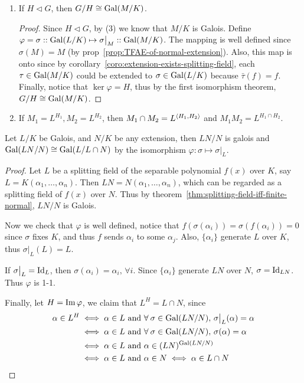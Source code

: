 \begin{theorem}
\begin{enumerate}[(\arabic*)]
    \item If $H \lhd G$, then $G / H \cong \operatorname{Gal}(M/K)$.
      \begin{proof}
        Since $H \lhd G$, by (3) we know that $M/K$ is Galois. Define $\varphi = \sigma :: \operatorname{Gal}(L/K)
        \mapsto \sigma\big|_M :: \operatorname{Gal}(M/K)$. The mapping is well defined
        since $\sigma(M) = M$ (by prop~\ref{prop:TFAE-of-normal-extension}).
        Also, this map is onto since by corollary~\ref{coro:extension-exists-splitting-field},
        each $\tau \in \operatorname{Gal}(M/K)$ could be extended to $\sigma \in \operatorname{Gal}(L/K)$ because
        $\bar\tau(f) = f$. Finally, notice that $\ker \varphi = H$, thus by the
        first isomorphism theorem, $G/H \cong \operatorname{Gal}(M/K)$.
      \end{proof}

    \item If $M_1 = L^{H_1}, M_2 = L^{H_2}$, then $M_1 \cap M_2 = L^{\langle H_1, H_2\rangle}$ and
      $M_1 M_2 = L^{H_1 \cap H_2}$.
  \end{enumerate}
\end{theorem}

\begin{theorem}
  Let $L/K$ be Galois, and $N/K$ be any extension, then $LN / N$ is galois and
  $\operatorname{Gal}({LN}/{N}) \cong \operatorname{Gal}({L}/{L \cap N})$ by the isomorphism
  $\varphi : \sigma \mapsto \sigma\big|_L$.

  \begin{proof}
    Let $L$ be a splitting field of the separable polynomial $f(x)$ over $K$,
    say $L = K(\alpha_1, \dots, \alpha_n)$. Then $LN = N(\alpha_1, \dots, \alpha_n)$,
    which can be regarded as a splitting field of $f(x)$ over $N$.
    Thus by theorem~\ref{thm:splitting-field-iff-finite-normal}, $LN/N$ is Galois.

    Now we check that $\varphi$ is well defined, notice that $f(\sigma(\alpha_i))
    = \sigma(f(\alpha_i)) = 0$ since $\sigma$ fixes $K$, and thus $f$ sends $\alpha_i$
    to some $\alpha_j$. Also, $\{ \alpha_i \}$ generate $L$ over $K$, thus $\sigma\big|_L(L) = L$.

    If $\sigma\big|_L = {\rm Id}_L$, then $\sigma(\alpha_i) = \alpha_i, \, \forall i$.
    Since $\{\alpha_i\}$ generate $LN$ over $N$, $\sigma = {\rm Id}_{LN}$. Thus $\varphi$ is 1-1.

    Finally, let $H = \operatorname{Im} \varphi$, we claim that $L^H = L \cap N$, since
      \begin{align*}
        \alpha \in L^H &\iff \alpha \in L \text{ and } \forall \sigma \in \Gal(LN/N),\, \sigma\big|_L(\alpha) = \alpha \\
        &\iff \alpha \in L \text{ and } \forall \sigma \in \Gal(LN/N),\, \sigma(\alpha) = \alpha \\
        &\iff \alpha \in L \text{ and } \alpha \in (LN)^{\Gal(LN/N)} \\
        &\iff \alpha \in L \text{ and } \alpha \in N \iff \alpha \in L \cap N
      \end{align*}
  \end{proof}
\end{theorem}

